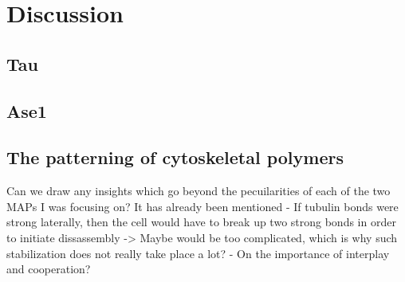 \chapter{Discussion}
\section{Tau}

\section{Ase1}


\section{The patterning of cytoskeletal polymers}
Can we draw any insights which go beyond the pecuilarities of each of the two MAPs I was focusing on? It has already been mentioned
- If tubulin bonds were strong laterally, then the cell would have to break up two strong bonds in order to initiate dissassembly -> Maybe would be too complicated, which is why such stabilization does not really take place a lot?
- On the importance of interplay and cooperation?